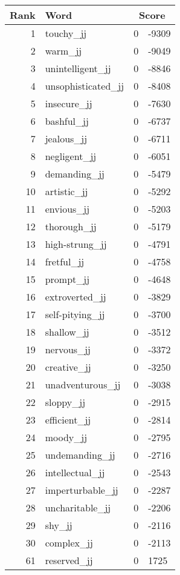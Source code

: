 \begin{longtable}[!htbp]{| rlr@{.}l |}
    \hline
    \textbf{Rank} & \textbf{Word} & \multicolumn{2}{c|}{\textbf{Score}} \\
    \hline
    \endhead
    1 & touchy\_jj & 0 & -9309 \\
    2 & warm\_jj & 0 & -9049 \\
    3 & unintelligent\_jj & 0 & -8846 \\
    4 & unsophisticated\_jj & 0 & -8408 \\
    5 & insecure\_jj & 0 & -7630 \\
    6 & bashful\_jj & 0 & -6737 \\
    7 & jealous\_jj & 0 & -6711 \\
    8 & negligent\_jj & 0 & -6051 \\
    9 & demanding\_jj & 0 & -5479 \\
    10 & artistic\_jj & 0 & -5292 \\
    11 & envious\_jj & 0 & -5203 \\
    12 & thorough\_jj & 0 & -5179 \\
    13 & high-strung\_jj & 0 & -4791 \\
    14 & fretful\_jj & 0 & -4758 \\
    15 & prompt\_jj & 0 & -4648 \\
    16 & extroverted\_jj & 0 & -3829 \\
    17 & self-pitying\_jj & 0 & -3700 \\
    18 & shallow\_jj & 0 & -3512 \\
    19 & nervous\_jj & 0 & -3372 \\
    20 & creative\_jj & 0 & -3250 \\
    21 & unadventurous\_jj & 0 & -3038 \\
    22 & sloppy\_jj & 0 & -2915 \\
    23 & efficient\_jj & 0 & -2814 \\
    24 & moody\_jj & 0 & -2795 \\
    25 & undemanding\_jj & 0 & -2716 \\
    26 & intellectual\_jj & 0 & -2543 \\
    27 & imperturbable\_jj & 0 & -2287 \\
    28 & uncharitable\_jj & 0 & -2206 \\
    29 & shy\_jj & 0 & -2116 \\
    30 & complex\_jj & 0 & -2113 \\
    61 & reserved\_jj & 0 & 1725 \\

\end{longtable}
